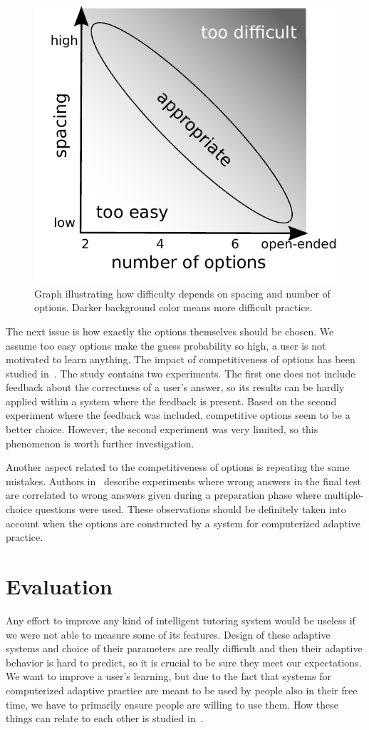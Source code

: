 \documentclass[table,color,cover,twoside,nolot,nolof]{fithesis3/fithesis3}
\begin{document}
\begin{figure}[h]
	\begin{center}
		\includegraphics[width=.5\textwidth]{figure/options_vs_spacing}
	\end{center}
	\caption{Graph illustrating how difficulty depends on spacing and number of
		options. Darker background color means more difficult practice.}
	\label{figure:options_vs_spacing}
\end{figure}

The next issue is how exactly the options themselves should be chosen. We
assume too easy options make the guess probability so high, a user is not
motivated to learn anything. The impact of competitiveness of options has been
studied in~\cite{little2015optimizing}. The study contains two experiments.
The first one does not include feedback about the correctness of a user's
answer, so its results can be hardly applied within a system where the
feedback is present. Based on the second experiment where the feedback was
included, competitive options seem to be a better choice. However, the second
experiment was very limited, so this phenomenon is worth further investigation.

Another aspect related to the competitiveness of options is repeating the
same mistakes. Authors in~\cite{marsh2007memorial} describe experiments where
wrong answers in the final test are correlated to wrong answers given during a
preparation phase where multiple-choice questions were used. These observations
should be definitely taken into account when the options are constructed by
a system for computerized adaptive practice.

\section{Evaluation}
\label{section:evaluation}

Any effort to improve any kind of intelligent tutoring system would be useless
if we were not able to measure some of its features. Design of these
adaptive systems and choice of their parameters are really difficult and then
their adaptive behavior is hard to predict, so it is crucial to be sure they
meet our expectations. We want to improve a user's learning, but due to
the fact that systems for computerized adaptive practice are meant to be used
by people also in their free time, we have to primarily ensure people are
willing to use them. How these things can relate to each other is studied
in~\cite{lomas2013optimizing}.
\end{document}
